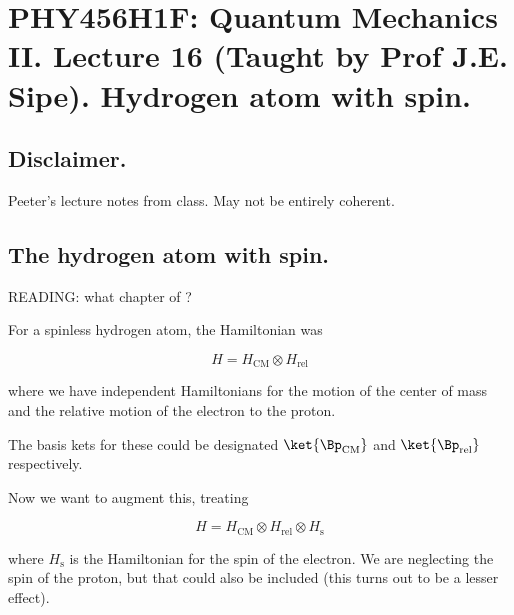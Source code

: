 
%

\chapter{PHY456H1F: Quantum Mechanics II.  Lecture 16 (Taught by Prof J.E. Sipe).  Hydrogen atom with spin.}
\label{chap:qmTwoL16}
{}
\date{Nov 2, 2011}

\beginArtWithToc


\section{Disclaimer.}

Peeter's lecture notes from class.  May not be entirely coherent.

\section{The hydrogen atom with spin.}

READING: what chapter of \cite{desai2009quantum} ?

For a spinless hydrogen atom, the Hamiltonian was

\begin{equation}\label{eqn:qmTwoL16:n}
H = H_{\text{CM}} \otimes H_{\text{rel}}
\end{equation}

where we have independent Hamiltonians for the motion of the center of mass and the relative motion of the electron to the proton.

The basis kets for these could be designated $\ket{\Bp_\text{CM}}$ and $\ket{\Bp_\text{rel}}$ respectively.

Now we want to augment this, treating

\begin{equation}\label{eqn:qmTwoL16:n}
H = H_{\text{CM}} \otimes H_{\text{rel}} \otimes H_{\text{s}}
\end{equation}

where $H_{\text{s}}$ is the Hamiltonian for the spin of the electron.  We are neglecting the spin of the proton, but that could also be included (this turns out to be a lesser effect).

